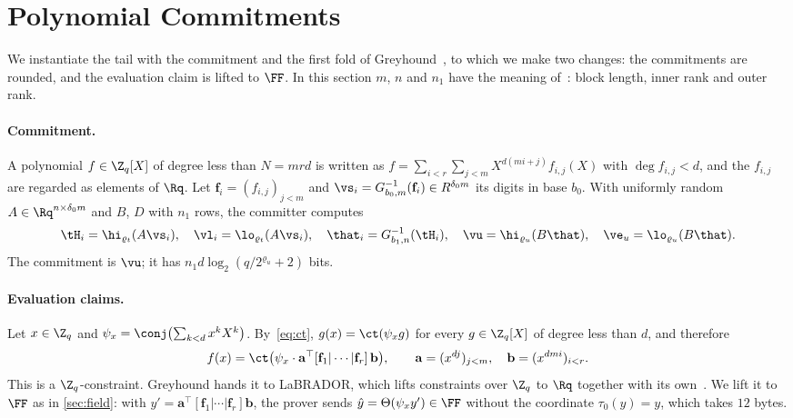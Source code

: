 \section{Polynomial Commitments}\label{sec:pcs}

We instantiate the tail with the commitment and the first fold of Greyhound~\cite{NS24}, to which we make two changes: the commitments are rounded, and the evaluation claim is lifted to $\FF$. In this section $m$, $n$ and $n_1$ have the meaning of~\cite{NS24}: block length, inner rank and outer rank.

\paragraph{Commitment.}
A polynomial $f\in\Z_q[X]$ of degree less than $N=mrd$ is written as $f=\sum_{i<r}\sum_{j<m}X^{d(mi+j)}f_{i,j}(X)$ with $\deg f_{i,j}<d$, and the $f_{i,j}$ are regarded as elements of $\Rq$. Let $\mathbf f_i=(f_{i,j})_{j<m}$ and $\vs_i=G^{-1}_{b_0,m}(\mathbf f_i)\in R^{\delta_0m}$ its digits in base $b_0$. With uniformly random $A\in\Rq^{n\times\delta_0m}$ and $B$, $D$ with $n_1$ rows, the committer computes
\[
\tH_i=\hi_{\varrho_t}(A\vs_i),\quad\vl_i=\lo_{\varrho_t}(A\vs_i),\quad\that_i=G^{-1}_{b_1,n}(\tH_i),\quad\vu=\hi_{\varrho_u}(B\that),\quad\ve_u=\lo_{\varrho_u}(B\that).
\]
The commitment is $\vu$; it has $n_1d\log_2(q/2^{\varrho_u}+2)$ bits.

\paragraph{Evaluation claims.}
Let $x\in\Z_q$ and $\psi_x=\conj\bigl(\sum_{k<d}x^kX^k\bigr)$. By~\eqref{eq:ct}, $g(x)=\ct(\psi_xg)$ for every $g\in\Z_q[X]$ of degree less than $d$, and therefore
\begin{equation}\label{eq:eval}
f(x)=\ct\bigl(\psi_x\cdot\mathbf a^\top[\mathbf f_1|\cdots|\mathbf f_r]\,\mathbf b\bigr),\qquad\mathbf a=(x^{dj})_{j<m},\quad\mathbf b=(x^{dmi})_{i<r} .
\end{equation}
This is a $\Z_q$-constraint. Greyhound hands it to LaBRADOR, which lifts constraints over $\Z_q$ to $\Rq$ together with its own~\cite[Remark~4.3]{NS24}. We lift it to $\FF$ as in \cref{sec:field}: with $y'=\mathbf a^\top[\mathbf f_1|\cdots|\mathbf f_r]\mathbf b$, the prover sends $\hat y=\Theta(\psi_xy')\in\FF$ without the coordinate $\tau_0(\hat y)=y$, which takes $12$ bytes.


